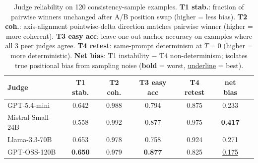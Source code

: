 \begin{table}[t]\centering\small
\setlength{\tabcolsep}{5pt}
\begin{tabular}{lcccccc}
\toprule
\textbf{Judge} & \textbf{T1 stab.} & \textbf{T2 coh.} & \textbf{T3 easy acc} & \textbf{T4 retest} & \textbf{net bias} \\
\midrule
GPT-5.4-mini        & 0.642 & 0.988 & 0.794 & 0.875 & 0.233 \\
Mistral-Small-24B   & 0.558 & 0.992 & 0.877 & 0.975 & \textbf{0.417} \\
Llama-3.3-70B       & 0.653 & 0.978 & 0.758 & 0.924 & 0.271 \\
GPT-OSS-120B        & \textbf{0.650} & 0.979 & \textbf{0.877} & 0.825 & \underline{0.175} \\
\bottomrule
\end{tabular}
\caption{%
  Judge reliability on 120 consistency-sample examples.
  \textbf{T1 stab.}: fraction of pairwise winners unchanged after A/B position swap (higher = less bias).
  \textbf{T2 coh.}: axis-alignment pointwise-delta direction matches pairwise winner (higher = more coherent).
  \textbf{T3 easy acc}: leave-one-out anchor accuracy on examples where all 3 peer judges agree.
  \textbf{T4 retest}: same-prompt determinism at $T\!=\!0$ (higher = more deterministic).
  \textbf{Net bias}: T1 instability $-$ T4 non-determinism; isolates true positional bias from sampling noise (\textbf{bold} = worst, \underline{underline} = best).
}
\label{tab:judge-reliability}
\end{table}
